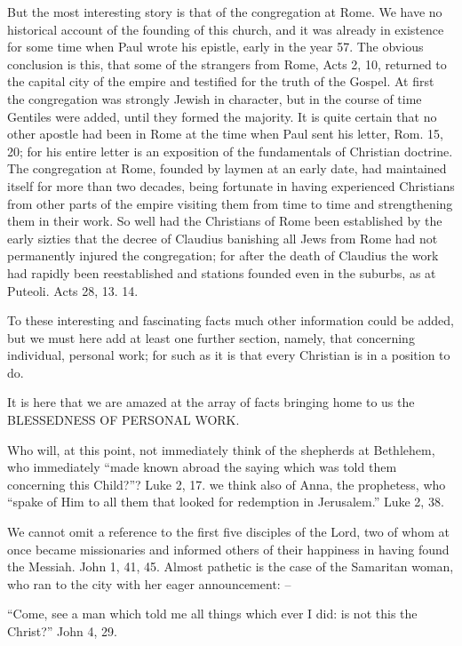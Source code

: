 \documentclass[
]{book}
\begin{document}
But the most interesting story is that of the congregation at Rome. We have no historical account of the founding of this church, and it was already in existence for some time when Paul wrote his epistle, early in the year 57. The obvious conclusion is this, that some of the strangers from Rome, Acts 2, 10, returned to the capital city of the empire and testified for the truth of the Gospel. At first the congregation was strongly Jewish in character, but in the course of time Gentiles were added, until they formed the majority. It is quite certain that no other apostle had been in Rome at the time when Paul sent his letter, Rom. 15, 20; for his entire letter is an exposition of the fundamentals of Christian doctrine. The congregation at Rome, founded by laymen at an early date, had maintained itself for more than two decades, being fortunate in having experienced Christians from other parts of the empire visiting them from time to time and strengthening them in their work. So well had the Christians of Rome been established by the early sizties that the decree of Claudius banishing all Jews from Rome had not permanently injured the congregation; for after the death of Claudius the work had rapidly been reestablished and stations founded even in the suburbs, as at Puteoli. Acts 28, 13. 14.

To these interesting and fascinating facts much other information could be added, but we must here add at least one further section, namely, that concerning individual, personal work; for such as it is that every Christian is in a position to do.

It is here that we are amazed at the array of facts bringing home to us the BLESSEDNESS OF PERSONAL WORK.

Who will, at this point, not immediately think of the shepherds at Bethlehem, who immediately ``made known abroad the saying which was told them concerning this Child?''? Luke 2, 17. we think also of Anna, the prophetess, who ``spake of Him to all them that looked for redemption in Jerusalem.'' Luke 2, 38.

We cannot omit a reference to the first five disciples of the Lord, two of whom at once became missionaries and informed others of their happiness in having found the Messiah. John 1, 41, 45. Almost pathetic is the case of the Samaritan woman, who ran to the city with her eager announcement: --

``Come, see a man which told me all things which ever I did: is not this the Christ?'' John 4, 29.
\end{document}
